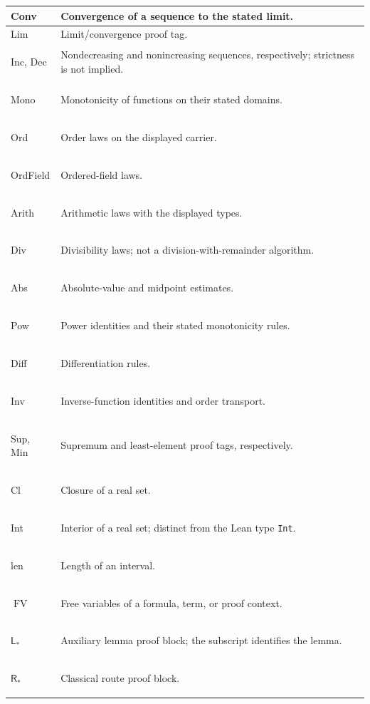 \documentclass[11pt,reqno]{amsart}
\makeatletter
\theoremstyle{blueplain}
\newcounter{type}
\newcommand{\defref}[1]{\hyperref[#1]{Definition~\ref*{#1}}}
\numberwithin{equation}{section}
\DeclareRobustCommand{\defref}[1]{%
  \hyperlink{def:#1}{\ensuremath{\csname PredicateName@#1\endcsname}}}
\def\defref#1{#1}%
\def\hyperlink#1#2{#2}}
\makeatother
\begin{document}
\begin{longtable}[c]{|>{\centering\arraybackslash}m{}|>{\centering\arraybackslash}m{}|}
\hypertarget{abbr:Conv}{}\defref{Conv} & Convergence of a sequence to the stated limit.\\\hline
\hypertarget{abbr:Lim}{}\defref{Lim} & Limit/convergence proof tag.\\\hline
\hypertarget{abbr:Inc}{}\defref{Inc}, \defref{Dec} & Nondecreasing and nonincreasing sequences, respectively; strictness is not implied.\\\hline
\hypertarget{abbr:Mono}{}\defref{Mono} & Monotonicity of functions on their stated domains.\\\hline
\hypertarget{abbr:Ord}{}\defref{Ord} & Order laws on the displayed carrier.\\\hline
\hypertarget{abbr:OrdField}{}\defref{OrdField} & Ordered-field laws.\\\hline
\hypertarget{abbr:Arith}{}\defref{Arith} & Arithmetic laws with the displayed types.\\\hline
\hypertarget{abbr:Div}{}\defref{Div} & Divisibility laws; not a division-with-remainder algorithm.\\\hline
\hypertarget{abbr:Abs}{}\defref{Abs} & Absolute-value and midpoint estimates.\\\hline
\hypertarget{abbr:Pow}{}\defref{Pow} & Power identities and their stated monotonicity rules.\\\hline
\hypertarget{abbr:Diff}{}\defref{Diff} & Differentiation rules.\\\hline
\hypertarget{abbr:Inv}{}\defref{Inv} & Inverse-function identities and order transport.\\\hline
\hypertarget{abbr:Sup}{}\defref{Sup}, \defref{Min} & Supremum and least-element proof tags, respectively.\\\hline
\hypertarget{abbr:Cl}{}\defref{Cl} & Closure of a real set.\\\hline
\hypertarget{abbr:Int}{}\defref{Int} & Interior of a real set; distinct from the Lean type \hyperlink{def:IntType}{\texttt{Int}}.\\\hline
\hypertarget{abbr:len}{}\defref{len} & Length of an interval.\\\hline
\hypertarget{abbr:FV}{}\hyperlink{def:ProofAnnotations}{$\operatorname{FV}$} & Free variables of a formula, term, or proof context.\\\hline
\hypertarget{abbr:L-blocks}{}\hyperlink{proof:L-E}{$\textsf{L}_{\ast}$} & Auxiliary lemma proof block; the subscript identifies the lemma.\\\hline
\hypertarget{abbr:R-blocks}{}\hyperlink{proof:R-1a}{$\textsf{R}_{\ast}$} & Classical route proof block.\\\hline

\end{longtable}
\end{document}
